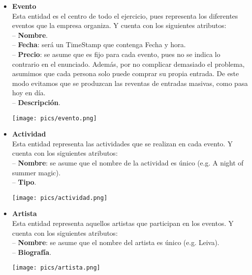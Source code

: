 \documentclass[12pt]{article}
\begin{document}
    \begin{itemize}

        \item \textbf{Evento}\\
            Esta entidad es el centro de todo el ejercicio, pues representa los diferentes eventos que la empresa organiza. 
            Y cuenta con los siguientes atributos: \\
                \hspace{0.5cm} -- {\bfseries Nombre}. \\
                \hspace{0.5cm} -- {\bfseries Fecha}: será un TimeStamp que contenga Fecha y hora. \\
                \hspace{0.5cm} -- {\bfseries Precio}: se asume que es fijo para cada evento, pues no se indica lo contrario en el enunciado. 
                Además, por no complicar demasiado el problema, asumimos que cada persona solo puede comprar su propia entrada. 
                De este modo evitamos que se produzcan las reventas de entradas masivas, como pasa hoy en día. \\
                \hspace{0.5cm} -- {\bfseries Descripción}. \\
            \begin{center}
            {\texttt{[image: pics/evento.png]}}
            \end{center}

        \item \textbf{Actividad}\\
            Esta entidad representa las actividades que se realizan en cada evento. 
            Y cuenta con los siguientes atributos:\\
                \hspace{0.5cm} -- {\bfseries Nombre}: se asume que el nombre de la actividad es único (e.g. A night of summer magic). \\
                \hspace{0.5cm} -- {\bfseries Tipo}. \\
            \begin{center}
            {\texttt{[image: pics/actividad.png]}}
            \end{center}

        \item \textbf{Artista}\\
            Esta entidad representa aquellos artistas que participan en los eventos. 
            Y cuenta con los siguientes atributos: \\
                \hspace{0.5cm} -- {\bfseries Nombre}: se asume que el nombre del artista es único (e.g. Leiva). \\
                \hspace{0.5cm} -- {\bfseries Biografía}. \\
            \begin{center}
            {\texttt{[image: pics/artista.png]}}
            \end{center}


\end{itemize}
\end{document}

